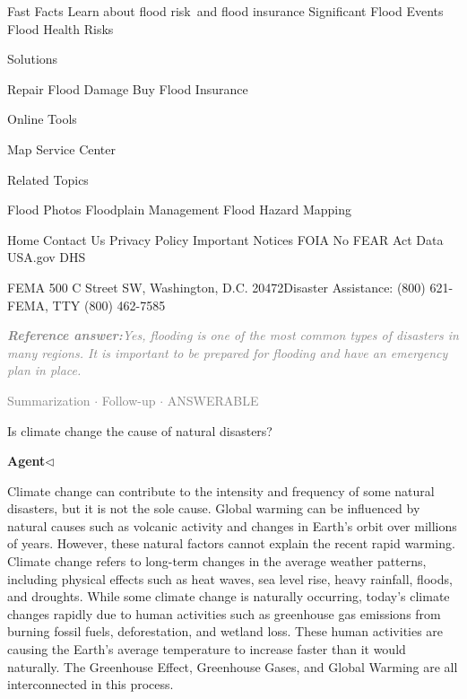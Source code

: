 \documentclass[a4paper,11pt]{article}
\begin{document}
\begin{docenv}
{Fast Facts
Learn about flood risk and flood insurance
Significant Flood Events
Flood Health Risks

Solutions

Repair Flood Damage
Buy Flood Insurance

Online Tools

Map Service Center

Related Topics

Flood Photos
Floodplain Management
Flood Hazard Mapping

Home
Contact Us
Privacy Policy
Important Notices
FOIA
No FEAR Act Data
USA.gov
DHS

FEMA 500 C Street SW, Washington, D.C. 20472Disaster Assistance: (800) 621-FEMA, TTY (800) 462-7585

 

}
\end{docenv}
\begin{refanswerenv}
{\footnotesize\textit{\textcolor{gray}{\textbf{Reference answer:}\enspace Yes, flooding is one of the most common types of disasters in many regions. It is important to be prepared for flooding and have an emergency plan in place.}}}
\end{refanswerenv}
\vspace{0.5em}
\hfill{\tiny\textcolor{gray}{Summarization $\cdot$ Follow-up $\cdot$ ANSWERABLE}}
\begin{userbubble}
Is climate change the cause of natural disasters?
\end{userbubble}
\noindent\hfill{\small\textcolor{agentcolor}{\textbf{Agent\enspace$\triangleleft$}}}
\begin{agentbubble}
Climate change can contribute to the intensity and frequency of some natural disasters, but it is not the sole cause. Global warming can be influenced by natural causes such as volcanic activity and changes in Earth's orbit over millions of years. However, these natural factors cannot explain the recent rapid warming. Climate change refers to long-term changes in the average weather patterns, including physical effects such as heat waves, sea level rise, heavy rainfall, floods, and droughts. While some climate change is naturally occurring, today's climate changes rapidly due to human activities such as greenhouse gas emissions from burning fossil fuels, deforestation, and wetland loss. These human activities are causing the Earth's average temperature to increase faster than it would naturally. The Greenhouse Effect, Greenhouse Gases, and Global Warming are all interconnected in this process.
\end{agentbubble}
\end{document}
